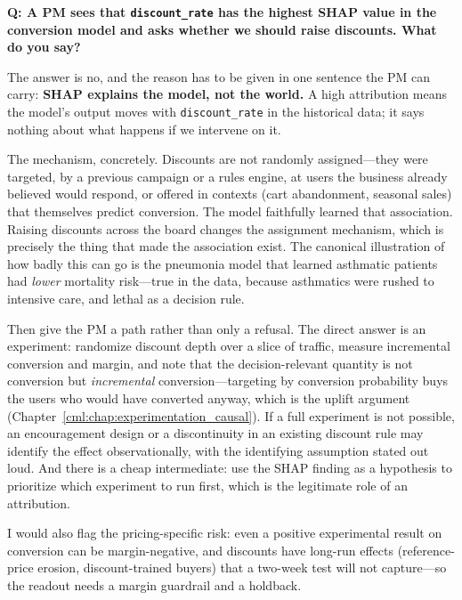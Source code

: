 \begin{interviewq}
\textbf{Q: A PM sees that \texttt{discount\_rate} has the highest SHAP value in the conversion model and asks whether we should raise discounts. What do you say?}

 \quad {} \quad \badgefreq{\freqmed}

\stronganswer

The answer is no, and the reason has to be given in one sentence the PM can carry: \textbf{SHAP explains the model, not the world.} A high attribution means the model's output moves with \texttt{discount\_rate} in the historical data; it says nothing about what happens if we intervene on it.

The mechanism, concretely. Discounts are not randomly assigned---they were targeted, by a previous campaign or a rules engine, at users the business already believed would respond, or offered in contexts (cart abandonment, seasonal sales) that themselves predict conversion. The model faithfully learned that association. Raising discounts across the board changes the assignment mechanism, which is precisely the thing that made the association exist. The canonical illustration of how badly this can go is the pneumonia model that learned asthmatic patients had \emph{lower} mortality risk---true in the data, because asthmatics were rushed to intensive care, and lethal as a decision rule.

Then give the PM a path rather than only a refusal. The direct answer is an experiment: randomize discount depth over a slice of traffic, measure incremental conversion and margin, and note that the decision-relevant quantity is not conversion but \emph{incremental} conversion---targeting by conversion probability buys the users who would have converted anyway, which is the uplift argument (Chapter~\ref{cml:chap:experimentation_causal}). If a full experiment is not possible, an encouragement design or a discontinuity in an existing discount rule may identify the effect observationally, with the identifying assumption stated out loud. And there is a cheap intermediate: use the SHAP finding as a hypothesis to prioritize which experiment to run first, which is the legitimate role of an attribution.

I would also flag the pricing-specific risk: even a positive experimental result on conversion can be margin-negative, and discounts have long-run effects (reference-price erosion, discount-trained buyers) that a two-week test will not capture---so the readout needs a margin guardrail and a holdback.


\end{interviewq}
